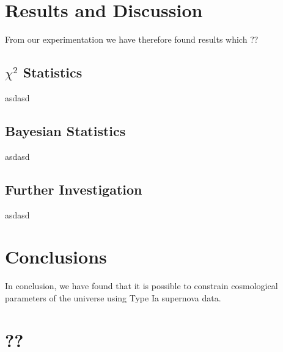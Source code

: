 \documentclass[twocolumn]{revtex4}
\begin{document}
\vspace{-3ex}
\section{Results and Discussion} 
\label{sec:results_discussion}
\vspace{-2ex}
From our experimentation we have therefore found results which ??

\vspace{-3ex}
\subsection{$\chi^2$ Statistics} 
\vspace{-2ex}

asdasd

\vspace{-3ex}
\subsection{Bayesian Statistics} 
\vspace{-2ex}

asdasd

\vspace{-3ex}
\subsection{Further Investigation} 
\vspace{-2ex}

asdasd

\vspace{-5ex}
\section{Conclusions}
\vspace{-2ex}

In conclusion, we have found that it is possible to constrain cosmological parameters of the universe using Type Ia supernova data.

\vspace{-3ex}



\clearpage
\appendix

\vfill
\twocolumngrid
\vspace{-3ex}
\section{??}
\vspace{-2ex}



\clearpage
\end{document}
